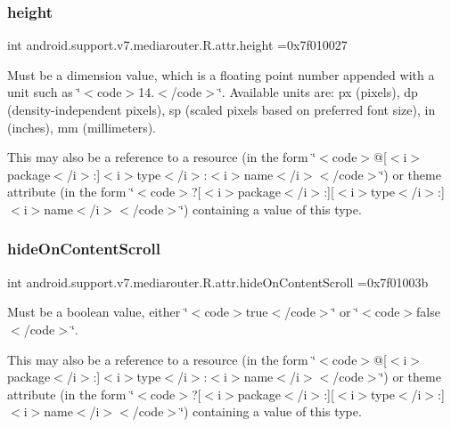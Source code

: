 \subsubsection{\texorpdfstring{height}{height}}
{\footnotesize\ttfamily int android.\+support.\+v7.\+mediarouter.\+R.\+attr.\+height =0x7f010027\hspace{0.3cm}{\ttfamily [static]}}

Must be a dimension value, which is a floating point number appended with a unit such as \char`\"{}$<$code$>$14.\+5sp$<$/code$>$\char`\"{}. Available units are\+: px (pixels), dp (density-\/independent pixels), sp (scaled pixels based on preferred font size), in (inches), mm (millimeters). 

This may also be a reference to a resource (in the form \char`\"{}$<$code$>$@\mbox{[}$<$i$>$package$<$/i$>$\+:\mbox{]}$<$i$>$type$<$/i$>$\+:$<$i$>$name$<$/i$>$$<$/code$>$\char`\"{}) or theme attribute (in the form \char`\"{}$<$code$>$?\mbox{[}$<$i$>$package$<$/i$>$\+:\mbox{]}\mbox{[}$<$i$>$type$<$/i$>$\+:\mbox{]}$<$i$>$name$<$/i$>$$<$/code$>$\char`\"{}) containing a value of this type. \mbox{\label{classandroid_1_1support_1_1v7_1_1mediarouter_1_1R_1_1attr_a3648c455c32e39588f76f8d24b3a6400}} 
\subsubsection{\texorpdfstring{hide\+On\+Content\+Scroll}{hideOnContentScroll}}
{\footnotesize\ttfamily int android.\+support.\+v7.\+mediarouter.\+R.\+attr.\+hide\+On\+Content\+Scroll =0x7f01003b\hspace{0.3cm}{\ttfamily [static]}}

Must be a boolean value, either \char`\"{}$<$code$>$true$<$/code$>$\char`\"{} or \char`\"{}$<$code$>$false$<$/code$>$\char`\"{}. 

This may also be a reference to a resource (in the form \char`\"{}$<$code$>$@\mbox{[}$<$i$>$package$<$/i$>$\+:\mbox{]}$<$i$>$type$<$/i$>$\+:$<$i$>$name$<$/i$>$$<$/code$>$\char`\"{}) or theme attribute (in the form \char`\"{}$<$code$>$?\mbox{[}$<$i$>$package$<$/i$>$\+:\mbox{]}\mbox{[}$<$i$>$type$<$/i$>$\+:\mbox{]}$<$i$>$name$<$/i$>$$<$/code$>$\char`\"{}) containing a value of this type. \mbox{\label{classandroid_1_1support_1_1v7_1_1mediarouter_1_1R_1_1attr_a379b98c861daa2964b42107fb3a190fd}} 
